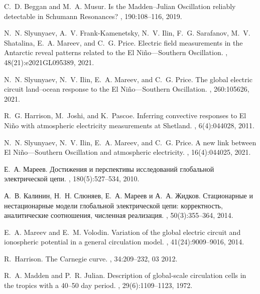 \documentclass[12pt, russian, a4paper]{article}
\begin{document}
\begin{thebibliography}{10}
C.~D. Beggan and M.~A. Musur.
\newblock Is the {M}adden–{J}ulian {O}scillation reliably detectable in
  {S}chumann {R}esonances?
, 190:108--116, 2019.

N.~N. Slyunyaev, A.~V. Frank-Kamenetsky, N.~V. Ilin, F.~G. Sarafanov, M.~V.
  Shatalina, E.~A. Mareev, and C.~G. Price.
\newblock Electric field measurements in the {A}ntarctic reveal patterns
  related to the {E}l {N}iño—{S}outhern {O}scillation.
, 48(21):e2021GL095389, 2021.

N.~N. Slyunyaev, N.~V. Ilin, E.~A. Mareev, and C.~G. Price.
\newblock The global electric circuit land–ocean response to the {E}l
  {N}iño—{S}outhern {O}scillation.
, 260:105626, 2021.

R.~G. Harrison, M.~Joshi, and K.~Pascoe.
\newblock Inferring convective responses to {E}l {N}iño with atmospheric
  electricity measurements at {S}hetland.
, 6(4):044028, 2011.

N.~N. Slyunyaev, N.~V. Ilin, E.~A. Mareev, and C.~G. Price.
\newblock A new link between {E}l {N}iño—{S}outhern {O}scillation and
  atmospheric electricity.
, 16(4):044025, 2021.

Е.~А. Мареев.
\newblock Достижения и перспективы
  исследований глобальной электрической
  цепи.
, 180(5):527--534, 2010.

А.~В. Калинин, Н.~Н. Слюняев, Е.~А. Мареев и
  А.~А. Жидков.
\newblock Стационарные и нестационарные модели
  глобальной электрической цепи:
  корректность, аналитические соотношения,
  численная реализация.
, 50(3):355--364, 2014.

E.~A. Mareev and E.~M. Volodin.
\newblock Variation of the global electric circuit and ionospheric potential in
  a general circulation model.
, 41(24):9009--9016, 2014.

R.~Harrison.
\newblock The {C}arnegie curve.
, 34:209--232, 03 2012.

R.~A. Madden and P.~R. Julian.
\newblock Description of global-scale circulation cells in the tropics with a
  40–50 day period.
, 29(6):1109--1123, 1972.


\end{thebibliography}
\end{document}
